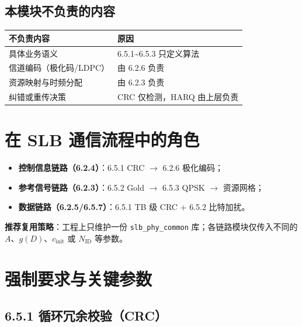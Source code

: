 \documentclass[11pt,a4paper]{ctexart}
\begin{document}
\subsection{本模块不负责的内容}

\begin{table}[h]
\centering
\small
\begin{tabular}{p{5.5cm}p{8.5cm}}
\toprule
\textbf{不负责内容} & \textbf{原因} \\
\midrule
具体业务语义 & 6.5.1\textasciitilde 6.5.3 只定义算法 \\
信道编码（极化码/LDPC） & 由 6.2.6 负责 \\
资源映射与时频分配 & 由 6.2.3 负责 \\
纠错或重传决策 & CRC 仅检测，HARQ 由上层负责 \\
\bottomrule
\end{tabular}
\end{table}

\section{在 SLB 通信流程中的角色}

\begin{itemize}
  \item \textbf{控制信息链路（6.2.4）}：6.5.1 CRC $\rightarrow$ 6.2.6 极化编码；
  \item \textbf{参考信号链路（6.2.3）}：6.5.2 Gold $\rightarrow$ 6.5.3 QPSK $\rightarrow$ 资源网格；
  \item \textbf{数据链路（6.2.5/6.5.7）}：6.5.1 TB 级 CRC $+$ 6.5.2 比特加扰。
\end{itemize}

\textbf{推荐复用策略}：工程上只维护一份 \texttt{slb\_phy\_common} 库；各链路模块仅传入不同的 $A$、$g(D)$、$c_{\mathrm{init}}$ 或 $N_{\mathrm{ID}}$ 等参数。

\section{强制要求与关键参数}

\subsection{6.5.1 循环冗余校验（CRC）}
\end{document}
